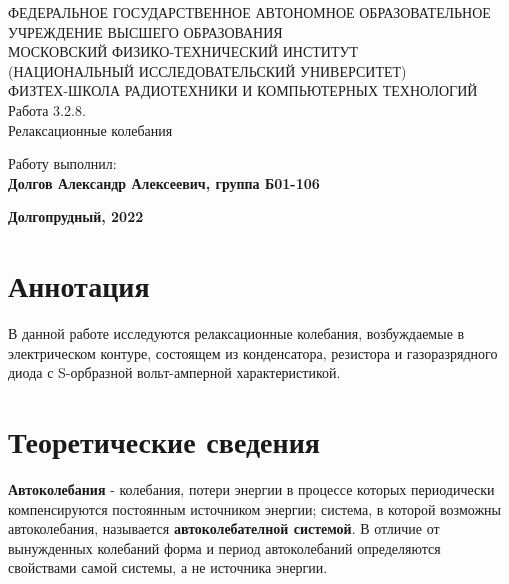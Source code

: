 \documentclass[14pt, a4paper,reqno]{article}
\begin{document}
\begin{center}
  {\small ФЕДЕРАЛЬНОЕ ГОСУДАРСТВЕННОЕ АВТОНОМНОЕ ОБРАЗОВАТЕЛЬНОЕ\\ УЧРЕЖДЕНИЕ ВЫСШЕГО ОБРАЗОВАНИЯ\\ МОСКОВСКИЙ ФИЗИКО-ТЕХНИЧЕСКИЙ ИНСТИТУТ\\ (НАЦИОНАЛЬНЫЙ ИССЛЕДОВАТЕЛЬСКИЙ УНИВЕРСИТЕТ)\\ ФИЗТЕХ-ШКОЛА РАДИОТЕХНИКИ И КОМПЬЮТЕРНЫХ ТЕХНОЛОГИЙ}\\
  \hfill \break
  \hfill \break
  \hfill \break
  \Huge{Работа 3.2.8. \\ Релаксационные колебания}\\
\end{center}

\hfill \break
\hfill \break
\hfill \break
\hfill \break
\hfill \break
\hfill \break
\hfill \break
\hfill \break

\begin{flushright}
  \normalsize{Работу выполнил:}\\
  \normalsize{\textbf{Долгов Александр Алексеевич, группа Б01-106}}\\
\end{flushright}

\vspace*{\fill} %

\begin{center}
  \normalsize{\textbf{Долгопрудный, 2022}}
\end{center}

\thispagestyle{empty} %


\newpage
\thispagestyle{plain}
\tableofcontents
\thispagestyle{plain}
\newpage
\section{Аннотация}

    В данной работе исследуются релаксационные колебания, возбуждаемые в электрическом контуре, состоящем
    из конденсатора, резистора и газоразрядного диода с S-орбразной вольт-амперной характеристикой.

\section{Теоретические сведения}

    \textbf{Автоколебания} - колебания, потери энергии в процессе которых периодически компенсируются
    постоянным источником энергии; система, в которой возможны автоколебания, называется
    \textbf{автоколебателной системой}. В отличие от вынужденных колебаний форма и период автоколебаний
    определяются свойствами самой системы, а не источника энергии.
\end{document}
